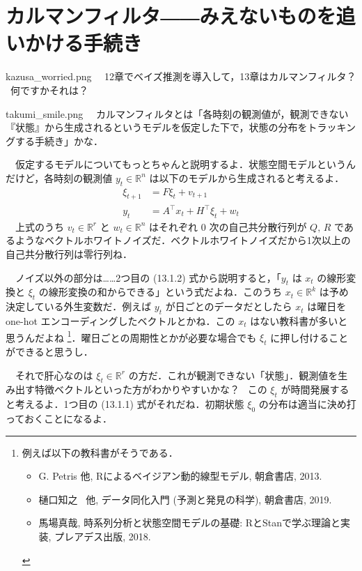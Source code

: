 \documentclass[b5paper,xelatex,ja=standard,10pt]{bxjsarticle}
\begin{document}


\section*{カルマンフィルタ――みえないものを追いかける手続き}
\vspace{3pt}


\begin{SERIFU}[colback=PaleIris,colbacktitle=PaleIris2]{kazusa_worried.png}
　12章でベイズ推測を導入して，13章はカルマンフィルタ？ \, 何ですかそれは？
\end{SERIFU}


\begin{SERIFU}[colback=PaleGold,colbacktitle=PaleGold2]{takumi_smile.png}
　カルマンフィルタとは「各時刻の観測値が，観測できない『状態』から生成されるというモデルを仮定した下で，状態の分布をトラッキングする手続き」かな．

　仮定するモデルについてもっとちゃんと説明するよ．{状態空間モデル}というんだけど，各時刻の観測値 $y_t \in \mathbb{R}^n$ は以下のモデルから生成されると考えるよ．
\begin{align}
\xi_{t+1} &= F \xi_t + v_{t + 1} \tag{13.1.1} \\
y_t &= A^\top x_t + H^\top \xi_t + w_t \tag{13.1.2}
\end{align}
　上式のうち $v_t \in \mathbb{R}^r$ と $w_t \in \mathbb{R}^n$ はそれぞれ 0 次の自己共分散行列が $Q, \, R$ であるようなベクトルホワイトノイズだ．ベクトルホワイトノイズだから1次以上の自己共分散行列は零行列ね．

　ノイズ以外の部分は……2つ目の (13.1.2) 式から説明すると，「$y_t$ は $x_t$ の線形変換と $\xi_t$ の線形変換の和からできる」という式だよね．このうち $x_t \in \mathbb{R}^k$ は予め決定している外生変数だ．例えば $y_t$ が日ごとのデータだとしたら $x_t$ は曜日を one-hot エンコーディングしたベクトルとかね．この $x_t$ はない教科書が多いと思うんだよね
\footnote{{例えば以下の教科書がそうである．\begin{itemize} \item G. Petris 他, Rによるベイジアン動的線型モデル, 朝倉書店, 2013. \item 樋口知之 \, 他, データ同化入門 (予測と発見の科学), 朝倉書店, 2019. \item 馬場真哉, 時系列分析と状態空間モデルの基礎: RとStanで学ぶ理論と実装, プレアデス出版, 2018. \end{itemize}}}．曜日ごとの周期性とかが必要な場合でも $\xi_t$ に押し付けることができると思うし．

　それで肝心なのは $\xi_t \in \mathbb{R}^r$ の方だ．これが観測できない「状態」．観測値を生み出す特徴ベクトルといった方がわかりやすいかな？ \, この $\xi_t$ が時間発展すると考えるよ．1つ目の (13.1.1) 式がそれだね．初期状態 $\xi_0$ の分布は適当に決め打っておくことになるよ．
\end{SERIFU}
\end{document}
